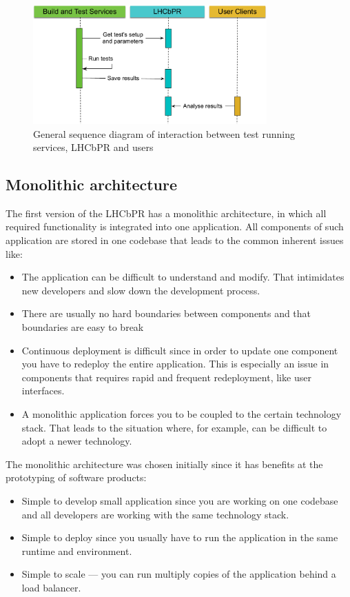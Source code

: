 \documentclass[a4paper]{jpconf}
\begin{document}
\begin{figure}[H]
\begin{minipage}{\textwidth}
\centering
\includegraphics[width=0.8\textwidth]{figs/lhcbpr-general.pdf}
\caption{\label{fig01} General sequence diagram of interaction between test
running services, LHCbPR and users}
\end{minipage}
\end{figure}

\subsection{Monolithic architecture}
The first version of the LHCbPR has a monolithic architecture, in which all
required functionality is integrated into one application. All components of
such application are stored in one codebase that leads to the common inherent
issues like:
\begin{itemize}
\item The application can be difficult to understand and modify. That
intimidates new developers and slow down the development process.
\item There are usually no hard boundaries between components and that
boundaries are easy to break
\item Continuous deployment is difficult since in order to update one component
you have to redeploy the entire application. This is especially an issue in
components that requires rapid and frequent redeployment, like user interfaces.
\item A monolithic application forces you to be coupled to the certain
technology stack. That leads to the situation where, for example, can be
difficult to adopt a newer technology.
\end{itemize}

The monolithic architecture was chosen initially since it has benefits at the
prototyping of software products:
\begin{itemize}
\item Simple to develop small application since you are working on one codebase
and all developers are working with the same technology stack.  
\item Simple to deploy since you usually have to run the application in the same
runtime and environment.
\item Simple to scale --- you can run multiply copies of the application behind a
load balancer.
\end{itemize}
\end{document}
